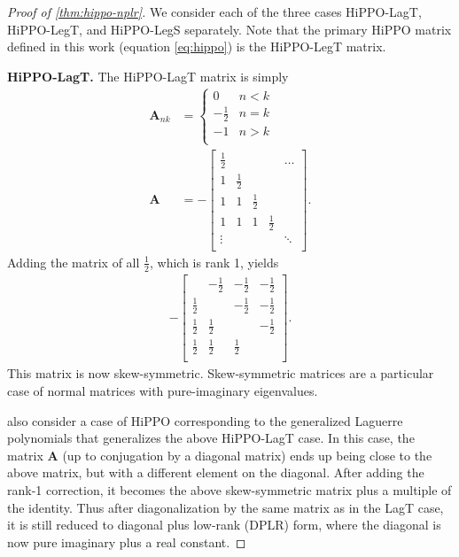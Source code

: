\begin{proof}[Proof of \cref{thm:hippo-nplr}]%
  We consider each of the three cases HiPPO-LagT, HiPPO-LegT, and HiPPO-LegS separately.
  Note that the primary HiPPO matrix defined in this work (equation \eqref{eq:hippo}) is the HiPPO-LegT matrix.

  \textbf{HiPPO-LagT.}
  The HiPPO-LagT matrix is simply
  \begin{align*}
    \bm{A}_{nk} &=
    \begin{cases}%
      0            & n < k \\
      -\frac{1}{2} & n=k   \\
      -1           & n > k \\
    \end{cases}
    \\
    \bm{A} &=
    -
    \begin{bmatrix}
      \frac{1}{2} &             &             &            & \dots \\
      1           & \frac{1}{2} &             &             \\
      1           & 1           & \frac{1}{2} &             \\
      1           & 1           & 1           & \frac{1}{2} \\
      \vdots      &             &             &              & \ddots \\
    \end{bmatrix}
    .
  \end{align*}
  Adding the matrix of all \( \frac{1}{2} \), which is rank 1, yields
  \begin{align*}
    -
    \begin{bmatrix}
      & -\frac{1}{2} & -\frac{1}{2} & -\frac{1}{2} \\
      \frac{1}{2} &              & -\frac{1}{2} & -\frac{1}{2} \\
      \frac{1}{2} & \frac{1}{2}  &              & -\frac{1}{2} \\
      \frac{1}{2} & \frac{1}{2}  & \frac{1}{2}  &              \\
    \end{bmatrix}
    .
  \end{align*}
  This matrix is now skew-symmetric.
  Skew-symmetric matrices are a particular case of normal matrices
  with pure-imaginary eigenvalues.

  \citet{gu2020hippo} also consider a case of HiPPO corresponding to the generalized Laguerre polynomials that generalizes
  the above HiPPO-LagT case.
  In this case, the matrix \( \bm{A} \) (up to conjugation by a diagonal matrix) ends up being close to the above matrix,
  but with a different element on the diagonal.
  After adding the rank-1 correction, it becomes the above skew-symmetric matrix plus a multiple of the identity.
  Thus after diagonalization by the same matrix as in the LagT case, it is still reduced to diagonal plus low-rank (DPLR) form,
  where the diagonal is now pure imaginary plus a real constant.


\end{proof}
